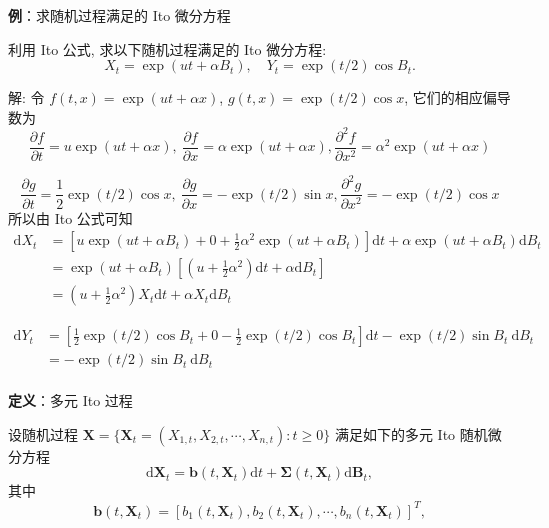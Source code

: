 \documentclass[openany]{ctexbook}
\theoremstyle{kaiti}
\theoremstyle{normal}
\begin{document}
\textbf{例}：求随机过程满足的 Ito 微分方程

利用 Ito 公式, 求以下随机过程满足的 Ito 微分方程:
\begin{equation}X_t=\exp(ut+\alpha B_t),\quad Y_t=\exp(t/2)\cos B_t.\end{equation}

解:  令 $f(t,x)=\exp(ut+\alpha x)$, $g(t,x)=\exp(t/2)\cos x$, 它们的相应偏导数为
\begin{equation}
  \frac{\partial f}{\partial t}=u\exp(ut+\alpha x),~\frac{\partial f}{\partial x}=\alpha\exp(ut+\alpha x),\frac{\partial^2 f}{\partial x^2}=\alpha^2\exp(ut+\alpha x)
\end{equation}

\begin{equation}
  \frac{\partial g}{\partial t}=\frac{1}{2}\exp(t/2)\cos x,~\frac{\partial g}{\partial x}=-\exp(t/2)\sin x,\frac{\partial^2 g}{\partial x^2}=-\exp(t/2)\cos x
\end{equation}
所以由 Ito 公式可知
\begin{equation}
  \begin{aligned}
    \mathrm{d}X_t&=\left[u\exp(ut+\alpha B_t)+0+\frac{1}{2}\alpha^2\exp(ut+\alpha B_t)\right]\mathrm{d}t+\alpha\exp(ut+\alpha B_t)\mathrm{d}B_t\\
    &=\exp(ut+\alpha B_t)\left[\left(u+\frac{1}{2}\alpha^2\right)\mathrm{d}t+\alpha\mathrm{d}B_t\right]\\
    &=\left(u+\frac{1}{2}\alpha^2\right)X_t\mathrm{d}t+\alpha X_t\mathrm{d}B_t
  \end{aligned}
\end{equation}

\begin{equation}
  \begin{aligned}
    \mathrm{d}Y_t&=\left[\frac{1}{2}\exp(t/2)\cos B_t+0-\frac{1}{2}\exp(t/2)\cos B_t\right]\mathrm{d}t-\exp(t/2)\sin B_t~\mathrm{d}B_t\\
    &=-\exp(t/2)\sin B_t~\mathrm{d}B_t\\
  \end{aligned}
\end{equation}

\textbf{定义}：多元 Ito 过程

设随机过程 $\bm{X}=\{\bm{X}_t=(X_{1,t},X_{2,t},\cdots,X_{n,t}):t\geqslant0\}$ 满足如下的多元 Ito 随机微分方程
\begin{equation}
  \mathrm{d}\bm{X}_t=\bm{b}(t,\bm{X}_t)\mathrm{d}t+\bm{\Sigma}(t,\bm{X}_t)\mathrm{d}\bm{B}_t,
\end{equation}
 其中
\begin{equation}
  \bm{b}(t,\bm{X}_t)=[b_1(t,\bm{X}_t),b_2(t,\bm{X}_t),\cdots,b_n(t,\bm{X}_t)]^T,
\end{equation}
\end{document}
